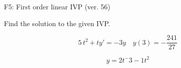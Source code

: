 \begin{exercise}
  \begin{exerciseTitle}F5: First order linear IVP (ver. 56)\end{exerciseTitle}
  \begin{exerciseStatement}
    
Find the solution to the given IVP.

    
\[5 \, t^{2} +ty'= -3 y \hspace{1em} y( 3 ) = -\frac{241}{27}\]

  \end{exerciseStatement}
  \begin{exerciseAnswer}
    
\[y= 2 t^ -3 -1 t^{2}\]

  \end{exerciseAnswer}
\end{exercise}